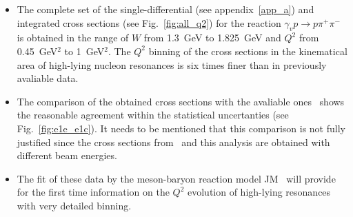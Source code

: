 \begin{itemize}

\item The complete set of the single-differential (see appendix~\ref{app_a}) and integrated cross sections (see Fig.~\ref{fig:all_q2}) for the reaction $\gamma_{v} p \rightarrow p \pi^{+} \pi^{-}$ is obtained in the range of $W$ from 1.3~GeV to 1.825~GeV and $Q^{2}$ from 0.45~GeV$^2$ to 1~GeV$^2$. The $Q^{2}$ binning of the cross sections in the kinematical area of high-lying nucleon resonances is six times finer than in previously avaliable data. 

\item The comparison of the obtained cross sections with the avaliable ones~\cite{Fedotov:2008aa} shows the reasonable agreement within the statistical uncertanties (see Fig.~\ref{fig:e1e_e1c}). It needs to be mentioned that this comparison is not fully justified since the cross sections from~\cite{Fedotov:2008aa} and this analysis are obtained with different beam energies.


\item The fit of these data by the meson-baryon reaction model JM~\cite{Mokeev:2008iw,Mokeev:2012vsa,Mokeev:2015lda} will provide for the first time information on the $Q^{2}$ evolution of high-lying resonances with very detailed binning.



\end{itemize}
